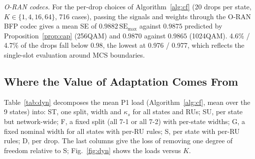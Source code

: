 \documentclass[10pt, final, journal, letterpaper, twocolumn]{IEEEtran}
\begin{document}
\begin{table}[t]
\centering
\caption{Per-drop P1 load [Gbit/s], mean over the 9 states; serving APs by~\cite{girycki2024twc}. In brackets: difference to OPT.}
\label{tab:prop3}
\footnotesize
{}
\end{table}

\emph{O-RAN codecs.} For the per-drop choices of Algorithm~\ref{alg:cf} (20 drops per state, $K\in\{1,4,16,64\}$, 716 cases), passing the signals and weights through the O-RAN BFP codec gives a mean SE of $0.9882\,\mathrm{SE}_{\max}$ against $0.9875$ predicted by Proposition~\ref{prop:cap} (256QAM) and $0.9870$ against $0.9865$ (1024QAM). 4.6\% / 4.7\% of the drops fall below 0.98, the lowest at 0.976 / 0.977, which reflects the single-slot evaluation around MCS boundaries.

\subsection{Where the Value of Adaptation Comes From}
\label{subsec:dynamics}

Table~\ref{tab:dyn} decomposes the mean P1 load (Algorithm~\ref{alg:cf}, mean over the 9 states) into: ST, one split, width and $\kappa_s$ for all states and RUs; SU, per state but network-wide; F, a fixed split (all 7-1 or all 7-2) with per-state widths; G, a fixed nominal width for all states with per-RU rules; S, per state with per-RU rules; D, per drop. The last columns give the loss of removing one degree of freedom relative to S; Fig.~\ref{fig:dyn} shows the loads versus $K$.
\end{document}
